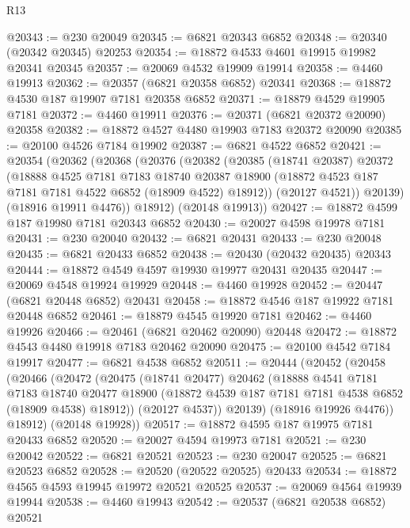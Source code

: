 \begin{lexlean}{R13}
\begin{coremodule}
@20343 := @230 @20049
@20345 := @6821 @20343 @6852
@20348 := @20340 (@20342 @20345) @20253
@20354 := @18872 @4533 @4601 @19915 @19982 @20341 @20345
@20357 := @20069 @4532 @19909 @19914
@20358 := @4460 @19913
@20362 := @20357 (@6821 @20358 @6852) @20341
@20368 := @18872 @4530 @187 @19907 @7181 @20358 @6852
@20371 := @18879 @4529 @19905 @7181
@20372 := @4460 @19911
@20376 := @20371 (@6821 @20372 @20090) @20358
@20382 := @18872 @4527 @4480 @19903 @7183 @20372 @20090
@20385 := @20100 @4526 @7184 @19902
@20387 := @6821 @4522 @6852
@20421 := @20354
    (@20362
      (@20368
        (@20376
          (@20382
            (@20385
              (@18741 @20387)
              @20372
              (@18888
                @4525
                @7181
                @7183
                @18740
                @20387
                @18900
                (@18872 @4523 @187 @7181 @7181 @4522 @6852 (@18909 @4522) @18912))
              (@20127 @4521))
            @20139)
          (@18916 @19911 @4476))
        @18912)
      (@20148 @19913))
@20427 := @18872 @4599 @187 @19980 @7181 @20343 @6852
@20430 := @20027 @4598 @19978 @7181
@20431 := @230 @20040
@20432 := @6821 @20431
@20433 := @230 @20048
@20435 := @6821 @20433 @6852
@20438 := @20430 (@20432 @20435) @20343
@20444 := @18872 @4549 @4597 @19930 @19977 @20431 @20435
@20447 := @20069 @4548 @19924 @19929
@20448 := @4460 @19928
@20452 := @20447 (@6821 @20448 @6852) @20431
@20458 := @18872 @4546 @187 @19922 @7181 @20448 @6852
@20461 := @18879 @4545 @19920 @7181
@20462 := @4460 @19926
@20466 := @20461 (@6821 @20462 @20090) @20448
@20472 := @18872 @4543 @4480 @19918 @7183 @20462 @20090
@20475 := @20100 @4542 @7184 @19917
@20477 := @6821 @4538 @6852
@20511 := @20444
    (@20452
      (@20458
        (@20466
          (@20472
            (@20475
              (@18741 @20477)
              @20462
              (@18888
                @4541
                @7181
                @7183
                @18740
                @20477
                @18900
                (@18872 @4539 @187 @7181 @7181 @4538 @6852 (@18909 @4538) @18912))
              (@20127 @4537))
            @20139)
          (@18916 @19926 @4476))
        @18912)
      (@20148 @19928))
@20517 := @18872 @4595 @187 @19975 @7181 @20433 @6852
@20520 := @20027 @4594 @19973 @7181
@20521 := @230 @20042
@20522 := @6821 @20521
@20523 := @230 @20047
@20525 := @6821 @20523 @6852
@20528 := @20520 (@20522 @20525) @20433
@20534 := @18872 @4565 @4593 @19945 @19972 @20521 @20525
@20537 := @20069 @4564 @19939 @19944
@20538 := @4460 @19943
@20542 := @20537 (@6821 @20538 @6852) @20521

\end{coremodule}
\end{lexlean}
